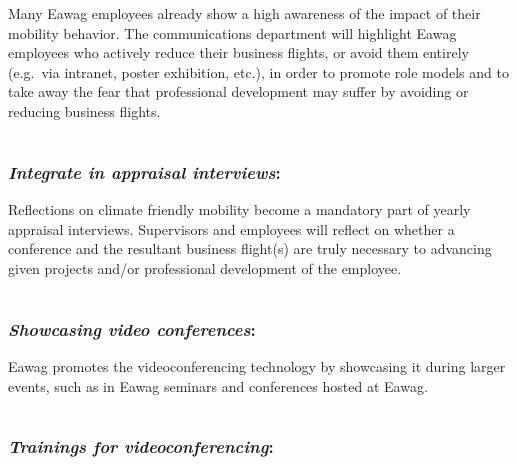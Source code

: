\documentclass[]{tufte-handout}
\begin{document}
Many Eawag employees already show a high awareness of the impact of
their mobility behavior. The communications department will highlight
Eawag employees who actively reduce their business flights, or avoid
them entirely (e.g.~via intranet, poster exhibition, etc.), in order to
promote role models and to take away the fear that professional
development may suffer by avoiding or reducing business flights.

\hypertarget{appraisal}{%
\section{}\label{appraisal}}

\hypertarget{integrate-in-appraisal-interviews}{%
\subsubsection{\texorpdfstring{\emph{Integrate in appraisal
interviews}:}{Integrate in appraisal interviews:}}\label{integrate-in-appraisal-interviews}}

Reflections on climate friendly mobility become a mandatory part of
yearly appraisal interviews. Supervisors and employees will reflect on
whether a conference and the resultant business flight(s) are truly
necessary to advancing given projects and/or professional development of
the employee.

\hypertarget{showcase_video}{%
\section{}\label{showcase_video}}

\hypertarget{showcasing-video-conferences}{%
\subsubsection{\texorpdfstring{\emph{Showcasing video
conferences}:}{Showcasing video conferences:}}\label{showcasing-video-conferences}}

Eawag promotes the videoconferencing technology by showcasing it during
larger events, such as in Eawag seminars and conferences hosted at
Eawag.

\hypertarget{video_training}{%
\section{}\label{video_training}}

\hypertarget{trainings-for-videoconferencing}{%
\subsubsection{\texorpdfstring{\emph{Trainings for
videoconferencing}:}{Trainings for videoconferencing:}}\label{trainings-for-videoconferencing}}
\end{document}
